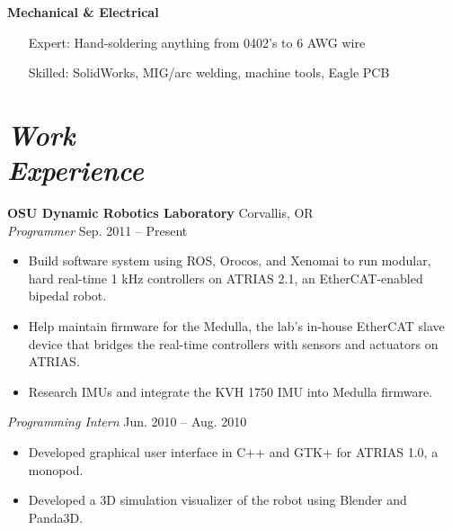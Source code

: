 \documentclass[10pt,letterpaper,margin]{res}
\begin{document}
\begin{resume}
{\bf Mechanical \& Electrical}\vspace{0.2em}

\begin{itemize}
	\setlength{\itemindent}{3em}
	\item[Expert:] Hand-soldering anything from 0402's to 6 AWG wire
	\item[Skilled:] SolidWorks, MIG/arc welding, machine tools, Eagle PCB
\end{itemize}



\section{\large\itshape Work \\ Experience}

% 


{\bf OSU Dynamic Robotics Laboratory} \hfill {\color{lightgray} Corvallis, OR} \\
{\it Programmer} \hfill {\color{lightgray} Sep. 2011 -- Present}\vspace{0.2em}

\begin{itemize}
	\item Build software system using ROS, Orocos, and Xenomai to run modular,
		hard real-time 1 kHz controllers on ATRIAS 2.1, an EtherCAT-enabled
		bipedal robot.
	\item Help maintain firmware for the Medulla, the lab's in-house EtherCAT
		slave device that bridges the real-time controllers with sensors and
		actuators on ATRIAS.
	\item Research IMUs and integrate the KVH 1750 IMU into Medulla firmware.
\end{itemize}

{\it Programming Intern} \hfill {\color{lightgray} Jun. 2010 -- Aug. 2010}\vspace{0.2em}

\begin{itemize}
	\item Developed graphical user interface in C++ and GTK+ for ATRIAS 1.0,
		a monopod.
	\item Developed a 3D simulation visualizer of the robot using Blender and
		Panda3D.
\end{itemize}




\end{resume}
\end{document}
